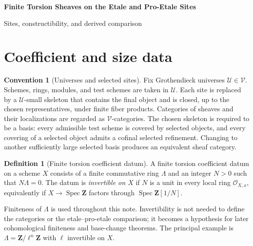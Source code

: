 \documentclass[10pt]{article}
\theoremstyle{definition}
\newtheorem{definition}[theorem]{Definition}
\newtheorem{convention}[theorem]{Convention}
\newcommand{\Lam}{\Lambda}
\begin{document}
\begin{center}
{\large\bfseries Finite Torsion Sheaves on the Etale and Pro-Etale Sites\par}
\medskip
{\normalsize Sites, constructibility, and derived comparison\par}
\end{center}

\begin{abstract}
This note isolates the finite-torsion foundation required before any adic
completion is formed.  It gives the sites, coefficient sheaves, constructible
hearts, the finite etale--pro-etale comparison, Verdier-localized derived
categories, the standard $t$-structure, derived tensor products, and scheme
pullback.  The comparison theorem is decomposed into its sheaf-theoretic,
cohomological, and derived constituents.  All derived categories below are
ordinary triangulated categories.  No direct-image theorem for a scheme
morphism, compact-support construction, duality theorem, or trace formula is
included here.
\end{abstract}

\tableofcontents

\section{Coefficient and size data}

\begin{convention}[Universes and selected sites]
Fix Grothendieck universes $\mathcal U\in\mathcal V$.  Schemes, rings, modules,
and test schemes are taken in $\mathcal U$.  Each site is replaced by a
$\mathcal U$-small skeleton that contains the final object and is closed, up to
the chosen representatives, under finite fiber products.  Categories of
sheaves and their localizations are regarded as $\mathcal V$-categories.
The chosen skeleton is required to be a basis: every admissible test scheme is
covered by selected objects, and every covering of a selected object admits a
cofinal selected refinement.  Changing to another sufficiently large selected
basis produces an equivalent sheaf category.
\end{convention}

\begin{definition}[Finite torsion coefficient datum]
A finite torsion coefficient datum on a scheme $X$ consists of a finite
commutative ring $\Lam$ and an integer $N>0$ such that $N\Lam=0$.  The datum is
\emph{invertible on $X$} if $N$ is a unit in every local ring
$\mathcal O_{X,x}$, equivalently if $X\to\operatorname{Spec}\mathbf Z$ factors
through $\operatorname{Spec}\mathbf Z[1/N]$.

Finiteness of $\Lam$ is used throughout this note.  Invertibility is not needed
to define the categories or the etale--pro-etale comparison; it becomes a
hypothesis for later cohomological finiteness and base-change theorems.  The
principal example is $\Lam=\mathbf Z/\ell^n\mathbf Z$ with $\ell$ invertible on
$X$.
\end{definition}
\end{document}
